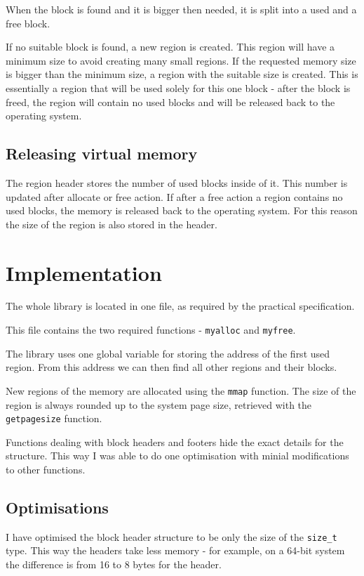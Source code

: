 \documentclass{article}
\begin{document}
When the block is found and it is bigger then needed, it is split into a used and a free block.

If no suitable block is found, a new region is created. This region will have a minimum size to avoid creating many small regions. If the requested memory size is bigger than the minimum size, a region with the suitable size is created. This is essentially a region that will be used solely for this one block - after the block is freed, the region will contain no used blocks and will be released back to the operating system.

\subsection{Releasing virtual memory}

The region header stores the number of used blocks inside of it. This number is updated after allocate or free action. If after a free action a region contains no used blocks, the memory is released back to the operating system. For this reason the size of the region is also stored in the header.

\section{Implementation}

The whole library is located in one file, as required by the practical specification.

This file contains the two required functions - \lstinline{myalloc} and \lstinline{myfree}.

The library uses one global variable for storing the address of the first used region. From this address we can then find all other regions and their blocks.

New regions of the memory are allocated using the \lstinline{mmap} function. The size of the region is always rounded up to the system page size, retrieved with the \lstinline{getpagesize} function.

Functions dealing with block headers and footers hide the exact details for the structure. This way I was able to do one optimisation with minial modifications to other functions.

\subsection{Optimisations}

I have optimised the block header structure to be only the size of the \lstinline{size_t} type. This way the headers take less memory - for example, on a 64-bit system the difference is from 16 to 8 bytes for the header.
\end{document}
